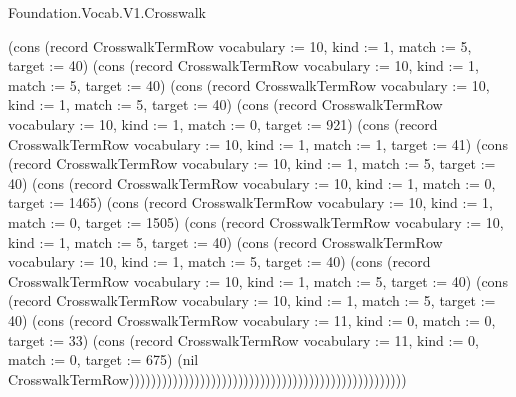\begin{lexlean}{Foundation.Vocab.V1.Crosswalk}
\begin{semanticmodule}
{(cons (record CrosswalkTermRow {vocabulary := 10, kind := 1, match := 5, target := 40}) (cons (record CrosswalkTermRow {vocabulary := 10, kind := 1, match := 5, target := 40}) (cons (record CrosswalkTermRow {vocabulary := 10, kind := 1, match := 5, target := 40}) (cons (record CrosswalkTermRow {vocabulary := 10, kind := 1, match := 0, target := 921}) (cons (record CrosswalkTermRow {vocabulary := 10, kind := 1, match := 1, target := 41}) (cons (record CrosswalkTermRow {vocabulary := 10, kind := 1, match := 5, target := 40}) (cons (record CrosswalkTermRow {vocabulary := 10, kind := 1, match := 0, target := 1465}) (cons (record CrosswalkTermRow {vocabulary := 10, kind := 1, match := 0, target := 1505}) (cons (record CrosswalkTermRow {vocabulary := 10, kind := 1, match := 5, target := 40}) (cons (record CrosswalkTermRow {vocabulary := 10, kind := 1, match := 5, target := 40}) (cons (record CrosswalkTermRow {vocabulary := 10, kind := 1, match := 5, target := 40}) (cons (record CrosswalkTermRow {vocabulary := 10, kind := 1, match := 5, target := 40}) (cons (record CrosswalkTermRow {vocabulary := 11, kind := 0, match := 0, target := 33}) (cons (record CrosswalkTermRow {vocabulary := 11, kind := 0, match := 0, target := 675}) (nil CrosswalkTermRow)))))))))))))))))))))))))))))))))))))))))))))))))))
}


\end{semanticmodule}
\end{lexlean}

